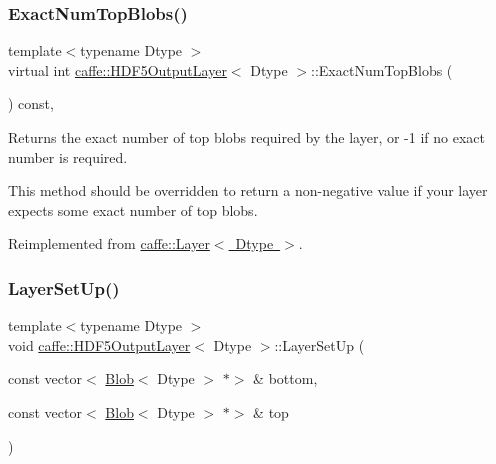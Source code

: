 \subsubsection{\texorpdfstring{Exact\+Num\+Top\+Blobs()}{ExactNumTopBlobs()}\hspace{0.1cm}{\footnotesize\ttfamily [2/2]}}
{\footnotesize\ttfamily template$<$typename Dtype $>$ \\
virtual int \mbox{\hyperlink{classcaffe_1_1_h_d_f5_output_layer}{caffe\+::\+H\+D\+F5\+Output\+Layer}}$<$ Dtype $>$\+::Exact\+Num\+Top\+Blobs (\begin{DoxyParamCaption}{ }\end{DoxyParamCaption}) const\hspace{0.3cm}{\ttfamily [inline]}, {\ttfamily [virtual]}}



Returns the exact number of top blobs required by the layer, or -\/1 if no exact number is required. 

This method should be overridden to return a non-\/negative value if your layer expects some exact number of top blobs. 

Reimplemented from \mbox{\hyperlink{classcaffe_1_1_layer_a64e2ca72c719e4b2f1f9216ccfb0d37f}{caffe\+::\+Layer$<$ Dtype $>$}}.

\mbox{\label{classcaffe_1_1_h_d_f5_output_layer_aed2dea5250c86c46dd866fbb241dd9f6}} 
\subsubsection{\texorpdfstring{Layer\+Set\+Up()}{LayerSetUp()}\hspace{0.1cm}{\footnotesize\ttfamily [1/2]}}
{\footnotesize\ttfamily template$<$typename Dtype $>$ \\
void \mbox{\hyperlink{classcaffe_1_1_h_d_f5_output_layer}{caffe\+::\+H\+D\+F5\+Output\+Layer}}$<$ Dtype $>$\+::Layer\+Set\+Up (\begin{DoxyParamCaption}\item[{const vector$<$ \mbox{\hyperlink{classcaffe_1_1_blob}{Blob}}$<$ Dtype $>$ $\ast$$>$ \&}]{bottom,  }\item[{const vector$<$ \mbox{\hyperlink{classcaffe_1_1_blob}{Blob}}$<$ Dtype $>$ $\ast$$>$ \&}]{top }\end{DoxyParamCaption})\hspace{0.3cm}{\ttfamily [virtual]}}



